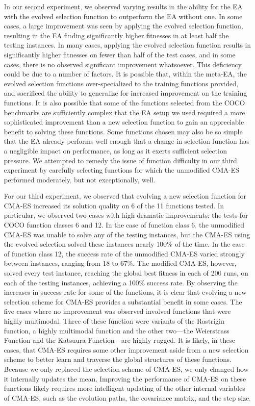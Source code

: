 \documentclass[sigconf]{acmart}
\begin{document}
In our second experiment, we observed varying results in the ability for the EA with the evolved selection function to outperform the EA without one. In some cases, a large improvement was seen by applying the evolved selection function, resulting in the EA finding significantly higher fitnesses in at least half the testing instances. In many cases, applying the evolved selection function results in significantly higher fitnesses on fewer than half of the test cases, and in some cases, there is no observed significant improvement whatsoever. This deficiency could be due to a number of factors. It is possible that, within the meta-EA, the evolved selection functions over-specialized to the training functions provided, and sacrificed the ability to generalize for increased improvement on the training functions. It is also possible that some of the functions selected from the COCO benchmarks are sufficiently complex that the EA setup we used required a more sophisticated improvement than a new selection function to gain an appreciable benefit to solving these functions. Some functions chosen may also be so simple that the EA already performs well enough that a change in selection function has a negligible impact on performance, as long as it exerts sufficient selection pressure. We attempted to remedy the issue of function difficulty in our third experiment by carefully selecting functions for which the unmodified CMA-ES performed moderately, but not exceptionally, well.

For our third experiment, we observed that evolving a new selection function for CMA-ES increased its solution quality on 6 of the 11 functions tested. In particular, we observed two cases with high dramatic improvements: the tests for COCO function classes 6 and 12. In the case of function class 6, the unmodified CMA-ES was unable to solve any of the testing instances, but the CMA-ES using the evolved selection solved these instances nearly 100\% of the time. In the case of function class 12, the success rate of the unmodified CMA-ES varied strongly between instances, ranging from 18 to 67\%. The modified CMA-ES, however, solved every test instance, reaching the global best fitness in each of 200 runs, on each of the testing instances, achieving a 100\% success rate. By observing the increases in success rate for some of the functions, it is clear that evolving a new selection scheme for CMA-ES provides a substantial benefit in some cases. The five cases where no improvement was observed involved functions that were highly multimodal. Three of these function were variants of the Rastrigin function, a highly multimodal function and the other two---the Weierstrass Function and the Katsuura Function---are highly rugged. It is likely, in these cases, that CMA-ES requires some other improvement aside from a new selection scheme to better learn and traverse the global structures of these functions. Because we only replaced the selection scheme of CMA-ES, we only changed how it internally updates the mean. Improving the performance of CMA-ES on these functions likely requires more intelligent updating of the other internal variables of CMA-ES, such as the evolution paths, the covariance matrix, and the step size.
\end{document}
